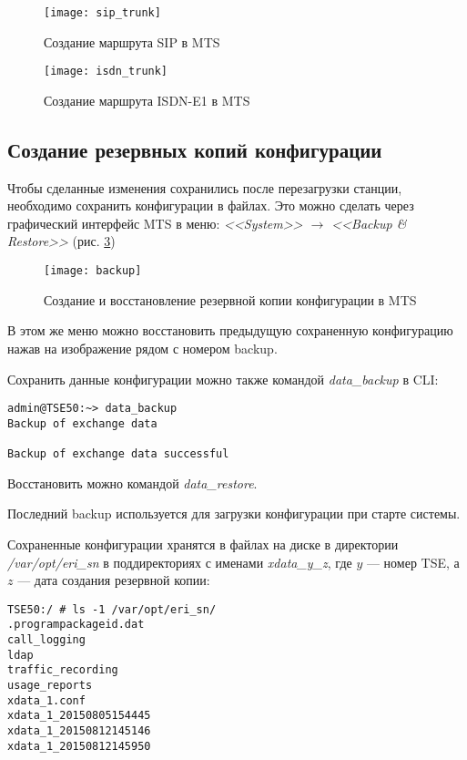 \begin{figure}[!ht]
  \center
  \texttt{[image: sip\_trunk]}
  \caption{Создание маршрута SIP в MTS}
  \label{img:sip_trunk}
\end{figure}

\begin{figure}[!ht]
  \center
  \texttt{[image: isdn\_trunk]}
  \caption{Создание маршрута ISDN-E1 в MTS}
  \label{img:isdn_trunk}
\end{figure}
\clearpage

\subsection{Создание резервных копий конфигурации}

Чтобы сделанные изменения сохранились после перезагрузки станции, необходимо сохранить конфигурации в файлах. Это можно сделать через графический интерфейс MTS в меню: {\em <<System>> $\rightarrow$ <<Backup \& Restore>>} (рис. \ref{img:backup})
\begin{figure}[!ht]
  \center
  \texttt{[image: backup]}
  \caption{Создание и восстановление резервной копии конфигурации в MTS}
  \label{img:backup}
\end{figure}

В этом же меню можно восстановить предыдущую сохраненную конфигурацию нажав на изображение рядом с номером backup. 

Сохранить данные конфигурации можно также командой {\em data\_backup} в CLI:
\begin{lstlisting}
admin@TSE50:~> data_backup
Backup of exchange data

Backup of exchange data successful
\end{lstlisting}
Восстановить можно командой  {\em data\_restore}.

Последний backup используется для загрузки конфигурации при старте системы.

Сохраненные конфигурации хранятся в файлах на диске в директории {\em /var/opt/eri\_sn} в поддиректориях с именами {\em xdata\_y\_z}, где $y$ --- номер TSE, а $z$ --- дата создания резервной копии:

\begin{lstlisting}
TSE50:/ # ls -1 /var/opt/eri_sn/
.programpackageid.dat
call_logging
ldap
traffic_recording
usage_reports
xdata_1.conf
xdata_1_20150805154445
xdata_1_20150812145146
xdata_1_20150812145950
\end{lstlisting}

